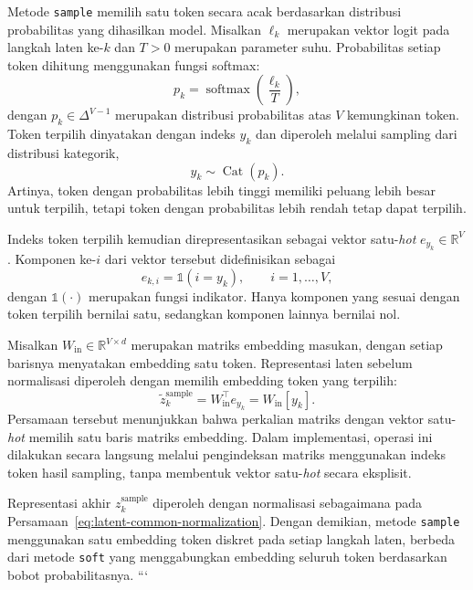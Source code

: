 Metode \texttt{sample} memilih satu token secara acak berdasarkan
distribusi probabilitas yang dihasilkan model. Misalkan $\ell_k$
merupakan vektor logit pada langkah laten ke-$k$ dan $T>0$
merupakan parameter suhu. Probabilitas setiap token dihitung
menggunakan fungsi softmax:
\begin{equation}
p_k=\operatorname{softmax}\left(\frac{\ell_k}{T}\right),
\label{eq:sample-probability}
\end{equation}
dengan $p_k\in\Delta^{V-1}$ merupakan distribusi probabilitas
atas $V$ kemungkinan token. Token terpilih dinyatakan dengan
indeks $y_k$ dan diperoleh melalui sampling dari distribusi
kategorik,
\begin{equation}
y_k\sim\operatorname{Cat}(p_k).
\label{eq:sample-categorical}
\end{equation}
Artinya, token dengan probabilitas lebih tinggi memiliki peluang
lebih besar untuk terpilih, tetapi token dengan probabilitas lebih
rendah tetap dapat terpilih.

Indeks token terpilih kemudian direpresentasikan sebagai vektor
satu-\textit{hot} $e_{y_k}\in\mathbb{R}^{V}$. Komponen ke-$i$
dari vektor tersebut didefinisikan sebagai
\begin{equation}
e_{k,i}=\mathbb{1}(i=y_k),
\qquad i=1,\ldots,V,
\label{eq:sample-onehot}
\end{equation}
dengan $\mathbb{1}(\cdot)$ merupakan fungsi indikator. Hanya
komponen yang sesuai dengan token terpilih bernilai satu,
sedangkan komponen lainnya bernilai nol.

Misalkan $W_{\mathrm{in}}\in\mathbb{R}^{V\times d}$ merupakan
matriks embedding masukan, dengan setiap barisnya menyatakan
embedding satu token. Representasi laten sebelum normalisasi
diperoleh dengan memilih embedding token yang terpilih:
\begin{equation}
\widetilde z_k^{\mathrm{sample}}
=
W_{\mathrm{in}}^\top e_{y_k}
=
W_{\mathrm{in}}[y_k].
\label{eq:sample-prelatent}
\end{equation}
Persamaan tersebut menunjukkan bahwa perkalian matriks dengan
vektor satu-\textit{hot} memilih satu baris matriks embedding.
Dalam implementasi, operasi ini dilakukan secara langsung
melalui pengindeksan matriks menggunakan indeks token hasil
sampling, tanpa membentuk vektor satu-\textit{hot} secara eksplisit.

Representasi akhir $z_k^{\mathrm{sample}}$ diperoleh dengan
normalisasi sebagaimana pada
Persamaan~\eqref{eq:latent-common-normalization}. Dengan demikian,
metode \texttt{sample} menggunakan satu embedding token diskret
pada setiap langkah laten, berbeda dari metode \texttt{soft}
yang menggabungkan embedding seluruh token berdasarkan
bobot probabilitasnya.
```


